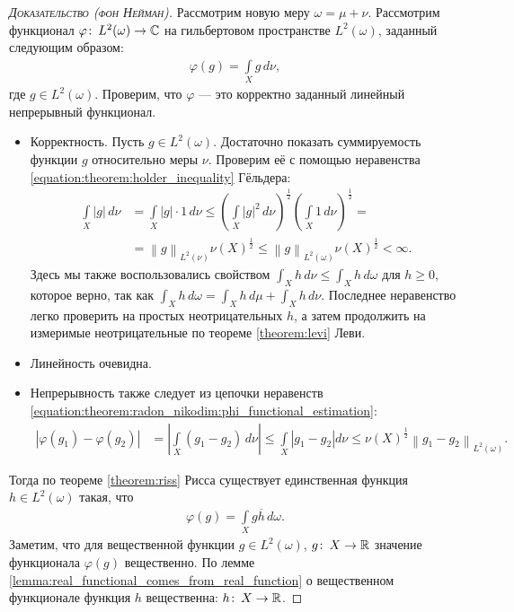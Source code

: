 \begin{proof}[\normalfont\textsc{Доказательство (фон Нейман)}]
 Рассмотрим новую меру $\omega = \mu + \nu$. Рассмотрим функционал $\varphi \colon\, L^{2}(\omega) \to \mathbb{C}$ на гильбертовом пространстве $L^{2}(\omega)$, заданный следующим образом:
 \begin{align*}
  \varphi(g) = \int\limits_{X} g \, d\nu 
 ,\end{align*} где $g \in L^{2}(\omega)$. Проверим, что $\varphi$ --- это корректно заданный линейный непрерывный функционал.
 \begin{itemize}
  \item Корректность. Пусть $g \in L^{2}(\omega)$. Достаточно показать суммируемость функции $g$ относительно меры $\nu$. Проверим её с помощью неравенства \ref{equation:theorem:holder_inequality} Гёльдера:
   \begin{align}
    \nonumber
    \int\limits_{X} \left| g \right| \, d\nu   &= \int\limits_{X} \left| g \right| \cdot 1 \, d\nu \leqslant  \left( \int\limits_{X} \left| g \right|^{2}\, d\nu  \right)^{\frac{1}{2}} \left( \int\limits_{X} 1 \, d\nu  \right)^{\frac{1}{2}} = \\
    \label{equation:theorem:radon_nikodim:phi_functional_estimation}
    &= \left\| g \right\|_{L^{2}(\nu)} \nu(X)^{\frac{1}{2}} \leqslant \left\| g \right\|_{L^{2}(\omega)} \nu(X)^{\frac{1}{2}} < \infty
   .\end{align} Здесь мы также воспользовались свойством $\int_{X} h \, d\nu \leqslant \int_{X}  h \, d\omega$ для $h \geqslant 0$, которое верно, так как $\int_{X}  h \, d\omega = \int_{X}  h \, d\mu + \int_{X}  h \, d\nu$. Последнее неравенство легко проверить на простых неотрицательных $h$, а затем продолжить на измеримые неотрицательные по теореме \ref{theorem:levi} Леви.
  \item Линейность очевидна.
  \item Непрерывность также следует из цепочки неравенств \eqref{equation:theorem:radon_nikodim:phi_functional_estimation}:
   \begin{align*}
    \left| \varphi(g_1) - \varphi(g_2) \right| &= \left| \int\limits_{X} (g_1-g_2)\, d\nu  \right| \leqslant \int\limits_{X} \left| g_1-g_2 \right| d\nu \leqslant \nu(X)^{\frac{1}{2}} \left\| g_1-g_2 \right\|_{L^{2}(\omega)}
   .\end{align*} 
 \end{itemize}

 Тогда по теореме \ref{theorem:riss} Рисса существует единственная функция $h \in L^{2}(\omega)$ такая, что 
 \begin{align*}
  \varphi(g) = \int\limits_{X} g\overline{h} \, d\omega  
 .\end{align*} Заметим, что для вещественной функции $g \in L^{2}(\omega)$, $g \colon\, X \to \mathbb{R}$ значение функционала $\varphi(g)$ вещественно. По лемме \ref{lemma:real_functional_comes_from_real_function} о вещественном функционале функция $h$ вещественна: $h \colon\, X \to \mathbb{R}$.


\end{proof}
